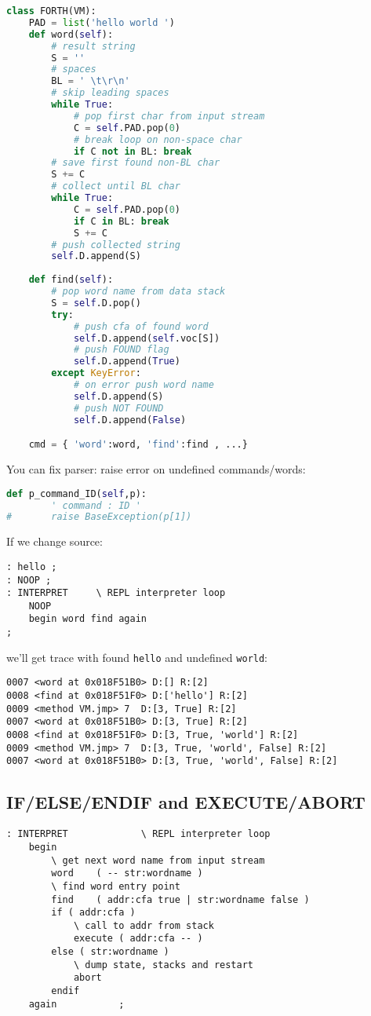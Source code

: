 \begin{lstlisting}[language=Python]
class FORTH(VM):
	PAD = list('hello world ')
	def word(self):
		# result string
		S = ''
		# spaces
		BL = ' \t\r\n'
		# skip leading spaces
		while True:
			# pop first char from input stream
			C = self.PAD.pop(0)
			# break loop on non-space char
			if C not in BL: break
		# save first found non-BL char
		S += C
		# collect until BL char
		while True:
			C = self.PAD.pop(0)
			if C in BL: break
			S += C
		# push collected string
		self.D.append(S)
	
	def find(self):
		# pop word name from data stack
		S = self.D.pop()
		try:
			# push cfa of found word
			self.D.append(self.voc[S])
			# push FOUND flag
			self.D.append(True)
		except KeyError:
			# on error push word name
			self.D.append(S)
			# push NOT FOUND
			self.D.append(False)

	cmd = { 'word':word, 'find':find , ...}
\end{lstlisting}
You can fix parser: raise error on undefined commands/words:
\begin{lstlisting}[language=Python]
  	def p_command_ID(self,p):
		' command : ID '
#		raise BaseException(p[1])
\end{lstlisting}

If we change source:
\begin{lstlisting}[language=Forth]
: hello ;
: NOOP ;
: INTERPRET		\ REPL interpreter loop
	NOOP
	begin word find again
;
\end{lstlisting}
we'll get trace with found \verb|hello| and undefined \verb|world|:
\begin{lstlisting}
0007 <word at 0x018F51B0> D:[] R:[2]
0008 <find at 0x018F51F0> D:['hello'] R:[2]
0009 <method VM.jmp> 7  D:[3, True] R:[2]
0007 <word at 0x018F51B0> D:[3, True] R:[2]
0008 <find at 0x018F51F0> D:[3, True, 'world'] R:[2]
0009 <method VM.jmp> 7  D:[3, True, 'world', False] R:[2]
0007 <word at 0x018F51B0> D:[3, True, 'world', False] R:[2]
\end{lstlisting}

\subsection{IF/ELSE/ENDIF and EXECUTE/ABORT}

\begin{lstlisting}[language=Forth]
: INTERPRET				\ REPL interpreter loop
	begin
		\ get next word name from input stream
		word	( -- str:wordname )
		\ find word entry point
		find 	( addr:cfa true | str:wordname false )
		if ( addr:cfa )
			\ call to addr from stack
			execute	( addr:cfa -- )
		else ( str:wordname )
			\ dump state, stacks and restart
			abort
		endif		
	again			;
\end{lstlisting}

